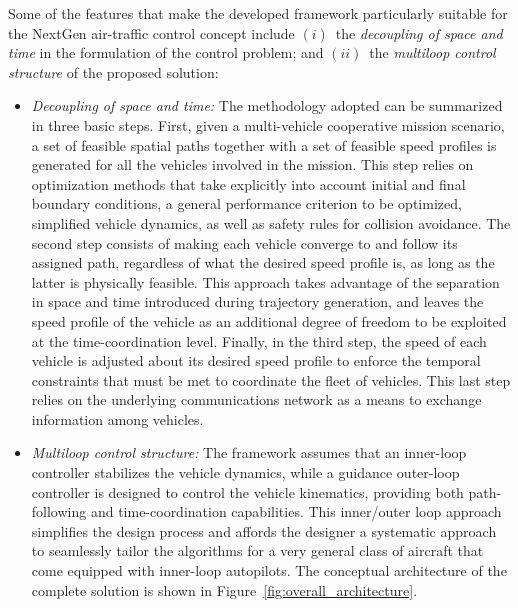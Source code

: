 \documentclass[letter,onecolumn,12pt]{aiaa-tc}
\newcommand{\1}{1_n}
\begin{document}
Some of the features that make the developed framework particularly suitable for the NextGen air-traffic control concept include $(i)$~the \emph{decoupling of space and time} in the formulation of the control problem; and $(ii)$~the \emph{multiloop control structure} of the proposed solution:
\begin{itemize}
\renewcommand{\labelitemi}{--}

\item \emph{Decoupling of space and time:} The methodology adopted can be summarized in three basic steps. First, given a multi-vehicle cooperative mission scenario, a set of feasible spatial paths together with a set of feasible speed profiles is generated for all the vehicles involved in the mission. This step relies on optimization methods that take explicitly into account initial and final boundary conditions, a general performance criterion to be optimized, simplified vehicle dynamics, as well as safety rules for collision avoidance. The second step consists of making each vehicle converge to and follow its assigned path, regardless of what the desired speed profile is, as long as the latter is physically feasible. This approach takes advantage of the separation in space and time introduced during trajectory generation, and leaves the speed profile of the vehicle as an additional degree of freedom to be exploited at the time-coordination level. Finally, in the third step, the speed of each vehicle is adjusted about its desired speed profile to enforce the temporal constraints that must be met to coordinate the fleet of vehicles. This last step relies on the underlying communications network as a means to exchange information among vehicles.

\item \emph{Multiloop control structure:} The framework assumes that an inner-loop controller stabilizes the vehicle dynamics, while a guidance outer-loop controller is designed to control the vehicle kinematics, providing both path-following and time-coordination capabilities. This inner/outer loop approach simplifies the design process and affords the designer a systematic approach to seamlessly tailor the algorithms for a very general class of aircraft that come equipped with inner-loop autopilots. The conceptual architecture of the complete solution is shown in Figure~\ref{fig:overall_architecture}.

\end{itemize}
\end{document}
